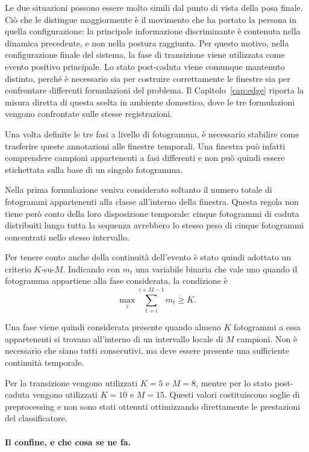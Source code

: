 Le due situazioni possono essere molto simili dal punto di vista della posa finale. Ciò che le distingue maggiormente è il movimento che ha portato la persona in quella configurazione: la principale informazione discriminante è contenuta nella dinamica precedente, e non nella postura raggiunta.
Per questo motivo, nella configurazione finale del sistema, la fase di transizione viene utilizzata come evento positivo principale. Lo stato post-caduta viene comunque mantenuto distinto, perché è necessario sia per costruire correttamente le finestre sia per confrontare differenti formulazioni del problema. Il Capitolo~\ref{cap:edge} riporta la misura diretta di questa scelta in ambiente domestico, dove le tre formulazioni vengono confrontate sulle stesse registrazioni.

Una volta definite le tre fasi a livello di fotogramma, è necessario stabilire come trasferire queste annotazioni alle finestre temporali. Una finestra può infatti comprendere campioni appartenenti a fasi differenti e non può quindi essere etichettata sulla base di un singolo fotogramma.

Nella prima formulazione veniva considerato soltanto il numero totale di fotogrammi appartenenti alla classe all'interno della finestra. Questa regola non tiene però conto della loro disposizione temporale: cinque fotogrammi di caduta distribuiti lungo tutta la sequenza avrebbero lo stesso peso di cinque fotogrammi concentrati nello stesso intervallo.

Per tenere conto anche della continuità dell'evento è stato quindi adottato un criterio $K$-su-$M$. Indicando con $m_t$ una variabile binaria che vale uno quando il fotogramma appartiene alla fase considerata, la condizione è
\[
\max_i \sum_{t=i}^{i+M-1} m_t \geq K.
\]

Una fase viene quindi considerata presente quando almeno $K$ fotogrammi a essa appartenenti si trovano all'interno di un intervallo locale di $M$ campioni. Non è necessario che siano tutti consecutivi, ma deve essere presente una sufficiente continuità temporale.

Per la transizione vengono utilizzati $K=5$ e $M=8$, mentre per lo stato post-caduta vengono utilizzati $K=10$ e $M=15$. Questi valori costituiscono soglie di preprocessing e non sono stati ottenuti ottimizzando direttamente le prestazioni del classificatore.

\paragraph{Il confine, e che cosa se ne fa.}


